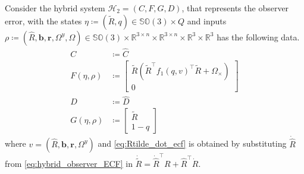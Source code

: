 \documentclass{article}
\newcommand{\SOthree}{\mathbb{SO}(3)}
\newcommand{\R}[1]{\mathbb{R}^{#1}}
\newcommand{\Omegay}{\Omega^y}
\newcommand{\brackets}[1]{\left(#1\right)}
\newcommand{\Rtilde}{\tilde{R}}
\begin{document}
Consider the hybrid system $\mathcal{H}_2 = (C, F, G, D)$, that represents the observer error, with the states $\eta \coloneqq (\Rtilde, q) \in \SOthree\times Q$ and inputs $\rho \coloneqq (\hat{R}, \mathbf{b}, \mathbf{r}, \Omegay, \Omega)\in\SOthree\times\R{3\times n}\times\R{3\times n}\times \R{3}\times \R{3}$ has the following data. 
\begin{subequations}\label{eq:hybrid_observer_error_explicit}
\begin{align}
C&\coloneqq \hat{C}\\
F(\eta, \rho)&\coloneqq \begin{bmatrix}
    \Rtilde\brackets{\Rtilde^\top f_1(q, v)^\top \Rtilde + \Omega_\times}\\ 0\end{bmatrix} \label{eq:Rtilde_dot_ecf}\\
D &\coloneqq \hat{D}\\
G(\eta, \rho) &\coloneqq \begin{bmatrix}
\Rtilde \\ 1 - q
\end{bmatrix}
\end{align}
\end{subequations}
where $v = (\hat{R}, \mathbf{b}, \mathbf{r}, \Omegay)$ and \eqref{eq:Rtilde_dot_ecf} is obtained by substituting $\dot{\hat{R}}$ from \eqref{eq:hybrid_observer_ECF} in $\dot{\Rtilde} = \dot{\hat{R}}^\top R + \hat{R}^\top \dot{R}$. 


\end{document}
